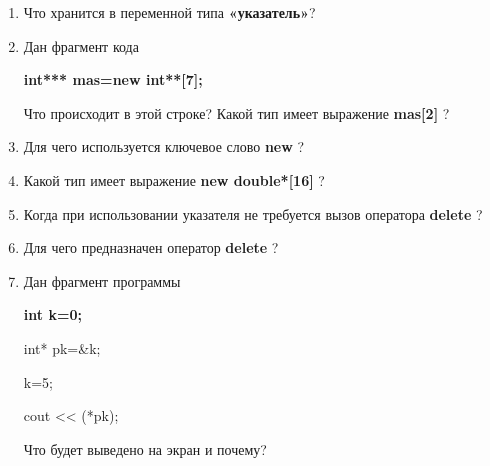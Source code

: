 \begin{enumerate}

	\item Что хранится в переменной типа {\bf  «указатель»}?

	\item Дан фрагмент кода

	{\bf int*** mas=new int**[7];}

	Что происходит в этой строке?
	Какой тип имеет выражение  {\bf mas[2] }?

	\item Для чего используется ключевое слово  {\bf new }?

	\item Какой тип имеет выражение  {\bf new double*[16] }?

	\item  Когда при использовании указателя не требуется вызов оператора {\bf delete} ?

	\item  Для чего предназначен оператор  {\bf delete} ?

	\item Дан фрагмент программы

		    {\bf
		       int k=0;

		       int* pk=\&k;

		       k=5;

		       cout << (*pk);
				}

	Что будет выведено на экран и почему?

\end{enumerate}

